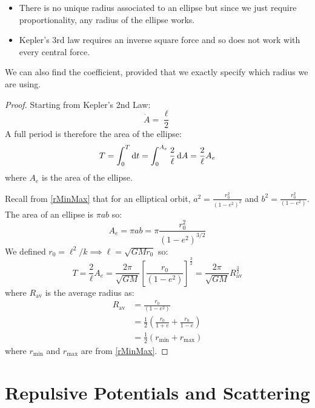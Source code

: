 \documentclass[../main.tex]{subfiles}
\begin{document}
\begin{remark}[Notes]
  \begin{itemize}
    \item There is no unique radius associated to an ellipse but since we just require proportionality, any radius of the ellipse works.
    \item Kepler's 3rd law requires an inverse square force and so does not work with every central force.
  \end{itemize}
\end{remark}
We can also find the coefficient, provided that we exactly specify which radius we are using.
\begin{proof}
  Starting from Kepler's 2nd Law:
  \[
    \dot{A} = \frac{\ell}{2}
  \]
  A full period is therefore the area of the ellipse:
  \[
    T = \int_{0}^{T}  \d{t} = \int_{0}^{A_e} \frac{2}{\ell} \d{A} = \frac{2}{\ell}A_e
  \]
  where $A_e$ is the area of the ellipse.

  Recall from \cref{rMinMax} that for an elliptical orbit, $a^2 = \frac{r^2_0}{(1 - e^2)^2}$ and $b^2 = \frac{r^2_0}{(1 - e^2)}$.
  The area of an ellipse is $\pi ab$ so:
  \[
    A_e = \pi ab = \pi\frac{r^2_0}{(1 - e^2)^{3/2}}
  \]
  We defined $r_0 = \ell^2/k  \implies \ell = \sqrt{GMr_0}$ so:
  \[
    T = \frac{2}{\ell}A_e = \frac{2\pi}{\sqrt{GM}}\left[\frac{r_0}{(1 - e^2)}\right]^{\frac{3}{2}} = \frac{2\pi}{\sqrt{GM}}R^{\frac{3}{2}}_{\text{av}}
  \]
  where $R_{\text{av}}$ is the average radius as:
  \begin{align*}
    R_{\text{av}} &= \frac{r_0}{(1 - e^2)} \\
                  &= \frac{1}{2}\left(\frac{r_0}{1 + e} + \frac{r_0}{1 - e}\right) \\
                  &= \frac{1}{2}(r_{\text{min}} + r_{\text{max}})
  \end{align*}
  where $r_{\text{min}}$ and $r_{\text{max}}$ are from \cref{rMinMax}.
\end{proof}
\section{Repulsive Potentials and Scattering}
\end{document}

